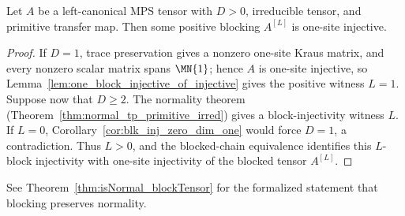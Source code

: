 \begin{theorem}%
    \label{thm:tp_primitive_irred_block_injective}
    \leanok
    Let $A$ be a left-canonical MPS tensor with $D > 0$, irreducible tensor,
    and primitive transfer map.
    Then some positive blocking $A^{[L]}$ is one-site injective.
\end{theorem}

\begin{proof}\leanok
    If $D=1$, trace preservation gives a nonzero one-site Kraus matrix, and
    every nonzero scalar matrix spans $\MN{1}$; hence $A$ is one-site
    injective, so Lemma~\ref{lem:one_block_injective_of_injective} gives the
    positive witness $L=1$. Suppose now that $D\geq 2$. The normality theorem
    (Theorem~\ref{thm:normal_tp_primitive_irred}) gives a block-injectivity
    witness $L$. If $L=0$, Corollary~\ref{cor:blk_inj_zero_dim_one} would
    force $D=1$, a contradiction. Thus $L>0$, and the blocked-chain
    equivalence identifies this $L$-block injectivity with one-site injectivity
    of the blocked tensor $A^{[L]}$.
\end{proof}

\begin{remark}
    See Theorem~\ref{thm:isNormal_blockTensor} for the formalized statement that blocking preserves normality.
\end{remark}
